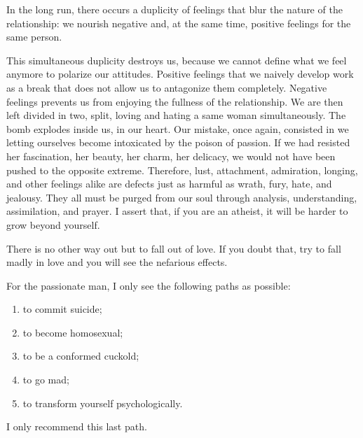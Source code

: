 \par In the long run, there occurs a duplicity of feelings that blur the nature of the relationship: we nourish negative and, at the same time, positive feelings for the same person.

\par This simultaneous duplicity destroys us, because we cannot define what we feel anymore to polarize our attitudes. Positive feelings that we naively develop work as a break that does not allow us to antagonize them completely. Negative feelings prevents us from enjoying the fullness of the relationship. We are then left divided in two, split, loving and hating a same woman simultaneously. The bomb explodes inside us, in our heart. Our mistake, once again, consisted in we letting ourselves become intoxicated by the poison of passion. If we had resisted her fascination, her beauty, her charm, her delicacy, we would not have been pushed to the opposite extreme. Therefore, lust, attachment, admiration, longing, and other feelings alike are defects just as harmful as wrath, fury, hate, and jealousy. They all must be purged from our soul through analysis, understanding, assimilation, and prayer. I assert that, if you are an atheist, it will be harder to grow beyond yourself.

\par There is no other way out but to fall out of love. If you doubt that, try to fall madly in love and you will see the nefarious effects.

\par For the passionate man, I only see the following paths as possible:
\begin{enumerate}
	\item to commit suicide;
	\item to become homosexual;
	\item to be a conformed cuckold;
	\item to go mad;
	\item to transform yourself psychologically.
\end{enumerate}

\par I only recommend this last path.

